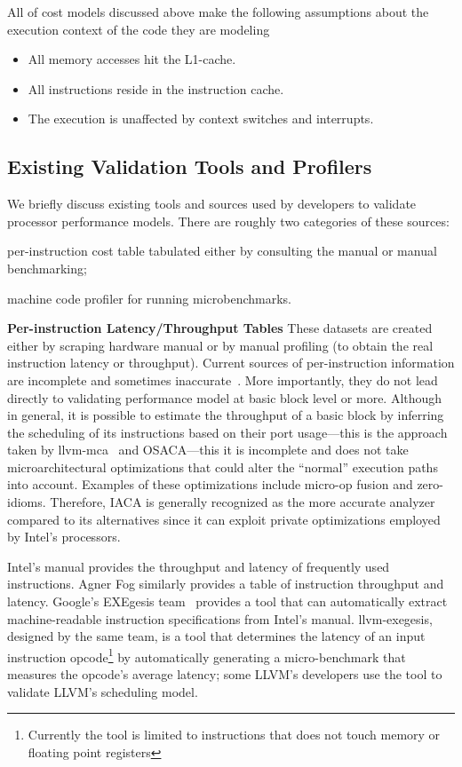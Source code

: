 \vspace{1em}
All of cost models discussed above make the following assumptions about the execution context
of the code they are modeling
\begin{itemize}
    \item All memory accesses hit the L1-cache.
    \item All instructions reside in the instruction cache.
    \item The execution is unaffected by context switches and interrupts.
\end{itemize}

\subsection{Existing Validation Tools and Profilers}
We briefly discuss existing tools and sources used by developers to validate
processor performance  models.
There are roughly two categories of these sources:
\begin{enumerate*}
\item per-instruction cost table tabulated either by
consulting the manual or manual benchmarking;
\item machine code profiler for running microbenchmarks.
\end{enumerate*}

\textbf{Per-instruction Latency/Throughput Tables}
These datasets are created either by scraping hardware manual or
by manual profiling 
(to obtain the real instruction latency or throughput).
Current sources of per-instruction information are incomplete and sometimes inaccurate~\cite{uops}. 
More importantly, they do not lead directly to validating performance model at basic block level or more.
Although in general, it is possible to estimate the throughput of 
a basic block by inferring the scheduling of its instructions based on their
port usage---this is the approach taken by llvm-mca~\cite{llvm-mca} and OSACA\cite{osaca}---this
it is incomplete and does not take microarchitectural
optimizations that could alter the ``normal'' execution paths into account. 
Examples of these optimizations include micro-op fusion and zero-idioms.
Therefore, IACA\cite{iaca} is generally recognized as the more accurate analyzer
compared to its alternatives since it can exploit
private optimizations employed by Intel's processors.

Intel's manual\cite{intel-manual} provides the throughput and latency
of frequently used instructions.
Agner Fog\cite{agner} similarly provides a table of instruction throughput and latency.
Google's EXEgesis team~\cite{exegesis} provides a tool that can automatically extract
machine-readable instruction specifications from Intel's manual.
llvm-exegesis, designed by the same team, is a tool that determines
the latency of an input instruction opcode\footnote{
Currently the tool is limited to instructions that does not touch memory or floating point registers} 
by automatically generating a micro-benchmark that measures the opcode's average latency;
some LLVM's developers use the tool to validate LLVM's scheduling model.

